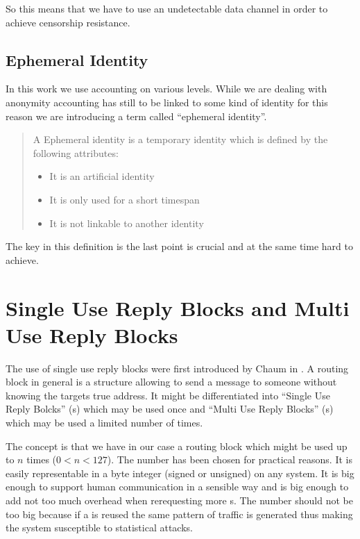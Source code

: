 So this means that we have to use an undetectable data channel in order to achieve censorship resistance.

\subsection{Ephemeral Identity}
In this work we use accounting on various levels. While we are dealing with anonymity accounting has still to be linked to some kind of identity for this reason we are introducing a term called ``ephemeral identity''.

\begin{quote}
	A Ephemeral identity is a temporary identity which is defined by the following attributes:
	\begin{itemize}
		\item It is an artificial identity
		\item It is only used for a short timespan
		\item It is not linkable to another identity
	\end{itemize}
\end{quote}

The key in this definition is the last point is crucial and at the same time hard to achieve.

\section{Single Use Reply Blocks and Multi Use Reply Blocks}
The use of single use reply blocks were first introduced by Chaum in \cite{CHAUM1}. A routing block in general is a structure allowing to send a message to someone without knowing the targets true address. It might be differentiated into ``Single Use Reply Bolcks'' (s) which may be used once and ``Multi Use Reply Blocks'' (s) which may be used a limited number of times. 

The concept is that we have in our case a routing block which might be used up to $n$ times ($0<n<127$). The number has been chosen for practical reasons. It is easily representable in a byte integer (signed or unsigned) on any system. It is big enough to support human communication in a sensible way and is big enough to add not too much overhead when rerequesting more s. The number should not be too big because if a  is reused the same pattern of traffic is generated thus making the system susceptible to statistical attacks.

